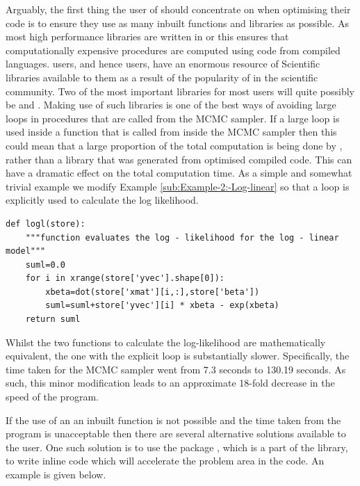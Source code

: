 \documentclass[article]{jss}
\begin{document}
Arguably, the first thing the user of  should concentrate
on when optimising their  code is to ensure they use as
many inbuilt functions and libraries as possible. As most high
performance libraries are written in  or
 this ensures that computationally expensive
procedures are computed using code from compiled languages.
 users, and hence  users, have an
enormous resource of Scientific libraries available to them as a
result of the popularity of  in the scientific
community. Two of the most important libraries for most users will
quite possibly be  and . Making use of such
libraries is one of the best ways of avoiding large loops in
procedures that are called from the MCMC sampler. If a large loop is
used inside a function that is called from inside the MCMC sampler
then this could mean that a large proportion of the total computation is
being done by , rather than a library that was
generated from optimised compiled code. This can have a dramatic
effect on the total computation time. As a simple and somewhat trivial
example we modify Example \ref{sub:Example-2:-Log-linear} so that a
loop is explicitly used to calculate the log likelihood.




\begin{lstlisting}[basicstyle={\scriptsize}]
def logl(store):
    """function evaluates the log - likelihood for the log - linear model"""
    suml=0.0
    for i in xrange(store['yvec'].shape[0]):
        xbeta=dot(store['xmat'][i,:],store['beta'])
        suml=suml+store['yvec'][i] * xbeta - exp(xbeta)
    return suml
\end{lstlisting}


Whilst the two functions to calculate the log-likelihood are
mathematically equivalent, the one with the explicit loop is
substantially slower.  Specifically, the time taken for the MCMC
sampler went from 7.3 seconds to 130.19 seconds. As such, this minor
modification leads to an approximate 18-fold decrease in the speed
of the program.

If the use of an an inbuilt function is not possible and the time
taken from the program is unacceptable then there are several
alternative solutions available to the user. One such solution is to
use the package , which is a part of the 
library, to write inline  code which will accelerate the
problem area in the code. An example is given below.
\end{document}

